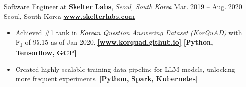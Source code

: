 \cveventflat
{Software Engineer at }
{\textbf{Skelter Labs}, \textit{Seoul, South Korea}}
{Mar. 2019 -- Aug. 2020}
{Seoul, South Korea}
\newline
\href{https://www.skelterlabs.com/}{\textbf{www.skelterlabs.com}}
\begin{itemize}
    \item {
        Achieved \#1 rank in \textit{Korean Question Answering Dataset (KorQuAD)}
        with F\textsubscript{1} of 95.15 as of Jan 2020.
    }
    \href{https://korquad.github.io/}{\textbf{[www.korquad.github.io]}}
    \textbf{[Python, Tensorflow, GCP]}
    \item Created highly scalable training data pipeline for LLM models, unlocking more frequent experiments.
    \textbf{[Python, Spark, Kubernetes]}
\end{itemize}
